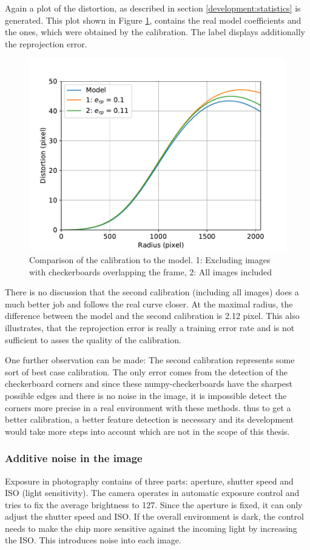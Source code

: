 Again a plot of the distortion, as described in section \ref{development:statistics} is generated.
This plot shown in Figure \ref{development:loc}, contains the real model coefficients and the ones, which were obtained by the calibration.
The label displays additionally the reprojection error.
\begin{figure}
	\centering
	\includegraphics[width=0.9\linewidth]{3-development/calibration/images/location.pdf}
	\caption{Comparison of the calibration to the model. 1: Excluding images with checkerboards overlapping the frame, 2: All images included \label{development:loc}}
\end{figure}
There is no discussion that the second calibration (including all images) does a much better job and follows the real curve closer.
At the maximal radius, the difference between the model and the second calibration is 2.12 pixel.
This also illustrates, that the reprojection error is really a training error rate and is not sufficient to asses the quality of the calibration.

One further observation can be made: The second calibration represents some sort of best case calibration.
The only error comes from the detection of the checkerboard corners and since these numpy-checkerboards have the sharpest possible edges and there is no noise in the image, it is impossible detect the corners more precise in a real environment with these methods.
thus to get a better calibration, a better feature detection is necessary and its development would take more steps into account which are not in the scope of this thesis.

\subsubsection{Additive noise in the image} 
Exposure in photography contains of three parts: aperture, shutter speed and ISO (light sensitivity).
The camera operates in automatic exposure control and tries to fix the average brightness to 127.
Since the aperture is fixed, it can only adjust the shutter speed and ISO.
If the overall environment is dark, the control needs to make the chip more sensitive against the incoming light by increasing the ISO.
This introduces noise into each image.

